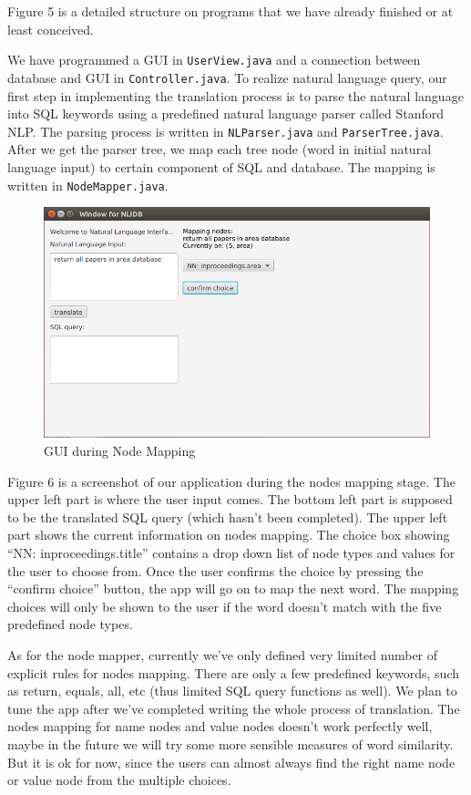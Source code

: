 \documentclass[twocolumn]{article}
\begin{document}
Figure 5 is a detailed structure on programs that we have already finished or at least conceived.

We have programmed a GUI in \texttt{UserView.java} and a connection between database and GUI in \texttt{Controller.java}. To realize natural language query, our first step in implementing the translation process is to parse the natural language into SQL keywords using a predefined natural language parser called Stanford NLP. The parsing process is written in \texttt{NLParser.java} and \texttt{ParserTree.java}. After we get the parser tree, we map each tree node (word in initial natural language input) to certain component of SQL and database. The mapping is written in \texttt{NodeMapper.java}.

\begin{figure}[ht]
  \centering
  \includegraphics[width=0.7\linewidth]{figures/gui_nodes_mapping.png}
  \caption{GUI during Node Mapping}
\end{figure}

Figure 6 is a screenshot of our application during the nodes mapping stage. The upper left part is where the user input comes. The bottom left part is supposed to be the translated SQL query (which hasn’t been completed). The upper left part shows the current information on nodes mapping. The choice box showing “NN: inproceedings.title” contains a drop down list of node types and values for the user to choose from. Once the user confirms the choice by pressing the “confirm choice” button, the app will go on to map the next word. The mapping choices will only be shown to the user if the word doesn’t match with the five predefined node types.

As for the node mapper, currently we’ve only defined very limited number of explicit rules for nodes mapping. There are only a few predefined keywords, such as return, equals, all, etc (thus limited SQL query functions as well). We plan to tune the app after we’ve completed writing the whole process of translation. The nodes mapping for name nodes and value nodes doesn’t work perfectly well, maybe in the future we will try some more sensible measures of word similarity. But it is ok for now, since the users can almost always find the right name node or value node from the multiple choices. 
\end{document}

